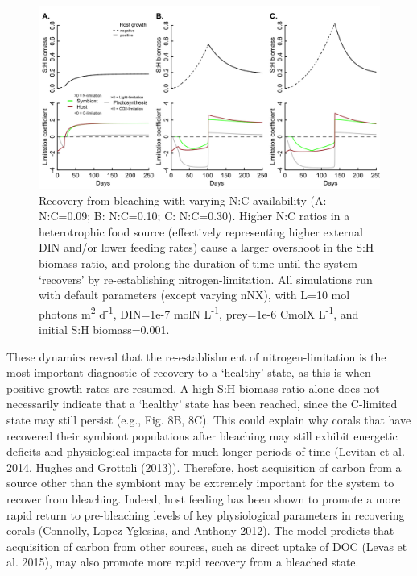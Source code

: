 \documentclass[]{elsarticle} %
\makeatletter
\def\maxwidth{\ifdim\Gin@nat@width>\linewidth\linewidth
\else\Gin@nat@width\fi}
\let\Oldincludegraphics\includegraphics
\renewcommand{\includegraphics}[1]{\Oldincludegraphics[width=\maxwidth]{#1}}
\makeatother
\begin{document}
\begin{figure}[htbp]
\centering
\includegraphics{../img/Fig8.png}
\caption{Recovery from bleaching with varying N:C availability (A:
N:C=0.09; B: N:C=0.10; C: N:C=0.30). Higher N:C ratios in a
heterotrophic food source (effectively representing higher external DIN
and/or lower feeding rates) cause a larger overshoot in the S:H biomass
ratio, and prolong the duration of time until the system `recovers' by
re-establishing nitrogen-limitation. All simulations run with default
parameters (except varying nNX), with L=10 mol photons
m\textsuperscript{2} d\textsuperscript{-1}, DIN=1e-7 molN
L\textsuperscript{-1}, prey=1e-6 CmolX L\textsuperscript{-1}, and
initial S:H biomass=0.001.}
\end{figure}

These dynamics reveal that the re-establishment of nitrogen-limitation
is the most important diagnostic of recovery to a `healthy' state, as
this is when positive growth rates are resumed. A high S:H biomass ratio
alone does not necessarily indicate that a `healthy' state has been
reached, since the C-limited state may still persist (e.g., Fig. 8B,
8C). This could explain why corals that have recovered their symbiont
populations after bleaching may still exhibit energetic deficits and
physiological impacts for much longer periods of time (Levitan et al.
2014, Hughes and Grottoli (2013)). Therefore, host acquisition of carbon
from a source other than the symbiont may be extremely important for the
system to recover from bleaching. Indeed, host feeding has been shown to
promote a more rapid return to pre-bleaching levels of key physiological
parameters in recovering corals (Connolly, Lopez-Yglesias, and Anthony
2012). The model predicts that acquisition of carbon from other sources,
such as direct uptake of DOC (Levas et al. 2015), may also promote more
rapid recovery from a bleached state.
\end{document}

